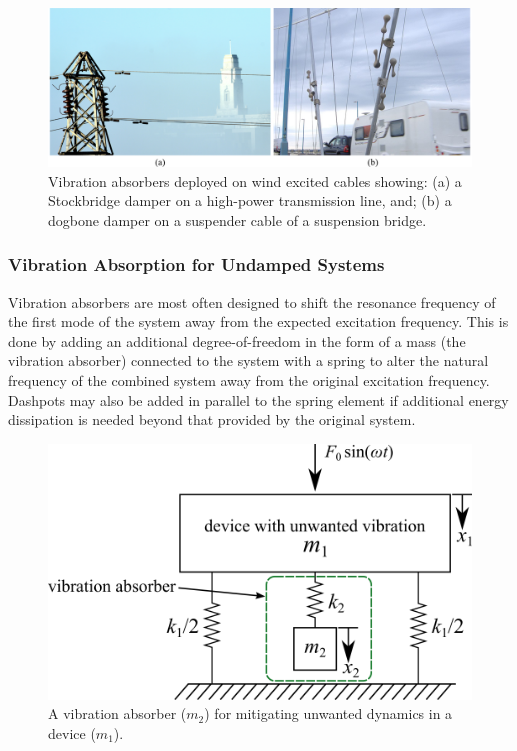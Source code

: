 \documentclass[12pt,letter]{article}
\begin{document}
\begin{figure}[H]
    \centering
    \includegraphics[width=6.5in]{../figures/vibration_absorbers}
    \caption{Vibration absorbers deployed on wind excited cables showing: (a) a Stockbridge damper on a high-power transmission line\protect\footnotemark[1], and; (b) a dogbone damper on a suspender cable of a suspension bridge\protect\footnotemark[2].}
    \label{fig:vibration_absorbers}
\end{figure}


\subsubsection{Vibration Absorption for Undamped Systems}
\label{sec:Vibration_Absorption_for_Undamped_Systems}

Vibration absorbers are most often designed to shift the resonance frequency of the first mode of the system away from the expected excitation frequency. This is done by adding an additional degree-of-freedom in the form of a mass (the vibration absorber) connected to the system with a spring to alter the natural frequency of the combined system away from the original excitation frequency. Dashpots may also be added in parallel to the spring element if additional energy dissipation is needed beyond that provided by the original system. 

\begin{figure}[H]
    \centering
    \includegraphics[]{../figures/vibration_absorber_spring_mass.png}
    \caption{A vibration absorber ($m_2$) for mitigating unwanted dynamics in a device ($m_1$).}
    \label{fig:vibration_absorber_spring_mass}
\end{figure}
\end{document}
